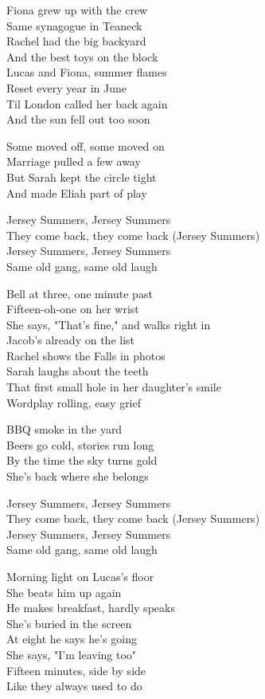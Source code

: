 \begin{lyrics}
Fiona grew up with the crew\\
Same synagogue in Teaneck\\
Rachel had the big backyard\\
And the best toys on the block\\
Lucas and Fiona, summer flames\\
Reset every year in June\\
Til London called her back again\\
And the sun fell out too soon

Some moved off, some moved on\\
Marriage pulled a few away\\
But Sarah kept the circle tight\\
And made Eliah part of play

Jersey Summers, Jersey Summers\\
They come back, they come back (Jersey Summers)\\
Jersey Summers, Jersey Summers\\
Same old gang, same old laugh

Bell at three, one minute past\\
Fifteen-oh-one on her wrist\\
She says, "That's fine," and walks right in\\
Jacob's already on the list\\
Rachel shows the Falls in photos\\
Sarah laughs about the teeth\\
That first small hole in her daughter’s smile\\
Wordplay rolling, easy grief

BBQ smoke in the yard\\
Beers go cold, stories run long\\
By the time the sky turns gold\\
She’s back where she belongs

Jersey Summers, Jersey Summers\\
They come back, they come back (Jersey Summers)\\
Jersey Summers, Jersey Summers\\
Same old gang, same old laugh

Morning light on Lucas’s floor\\
She beats him up again\\
He makes breakfast, hardly speaks\\
She’s buried in the screen\\
At eight he says he’s going\\
She says, "I’m leaving too"\\
Fifteen minutes, side by side\\
Like they always used to do


\end{lyrics}
